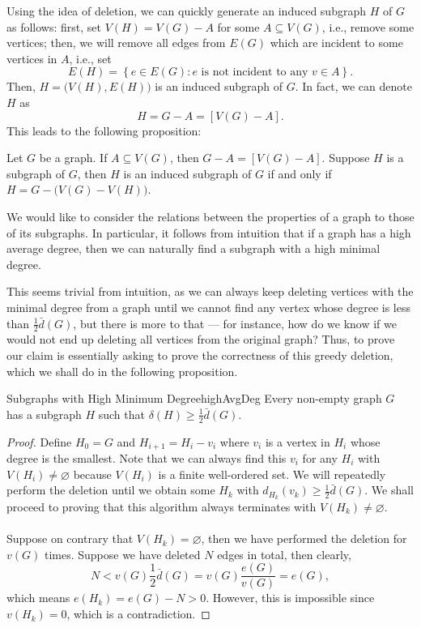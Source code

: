 \documentclass[math, code]{amznotes}
\theoremstyle{remark}
\begin{document}
Using the idea of deletion, we can quickly generate an induced subgraph $H$ of $G$ as follows: first, set $V(H) = V(G) - A$ for some $A \subseteq V(G)$, i.e., remove some vertices; then, we will remove all edges from $E(G)$ which are incident to some vertices in $A$, i.e., set
\begin{equation*}
    E(H) = \left\{e \in E(G) \colon e \textrm{ is not incident to any } v \in A\right\}.
\end{equation*}
Then, $H = \bigl(V(H), E(H)\bigr)$ is an induced subgraph of $G$. In fact, we can denote $H$ as
\begin{equation*}
    H = G - A = [V(G) - A].
\end{equation*}
This leads to the following proposition:
\begin{probox}{}{}
    Let $G$ be a graph. If $A \subseteq V(G)$, then $G - A = [V(G) - A]$. Suppose $H$ is a subgraph of $G$, then $H$ is an induced subgraph of $G$ if and only if $H = G - \bigl(V(G) - V(H)\bigr)$.
\end{probox}
We would like to consider the relations between the properties of a graph to those of its subgraphs. In particular, it follows from intuition that if a graph has a high average degree, then we can naturally find a subgraph with a high minimal degree.

This seems trivial from intuition, as we can always keep deleting vertices with the minimal degree from a graph until we cannot find any vertex whose degree is less than $\frac{1}{2}\bar{d}(G)$, but there is more to that --- for instance, how do we know if we would not end up deleting all vertices from the original graph? Thus, to prove our claim is essentially asking to prove the correctness of this greedy deletion, which we shall do in the following proposition.
\begin{probox}{Subgraphs with High Minimum Degree}{highAvgDeg}
    Every non-empty graph $G$ has a subgraph $H$ such that $\delta(H) \geq \frac{1}{2} \bar{d}(G)$.
    \tcblower
    \begin{proof}
        Define $H_0 = G$ and $H_{i + 1} = H_i - v_i$ where $v_i$ is a vertex in $H_i$ whose degree is the smallest. Note that we can always find this $v_i$ for any $H_i$ with $V(H_i) \neq \varnothing$ because $V(H_i)$ is a finite well-ordered set. We will repeatedly perform the deletion until we obtain some $H_k$ with $d_{H_k}(v_k) \geq \frac{1}{2}\bar{d}(G)$. We shall proceed to proving that this algorithm always terminates with $V(H_k) \neq \varnothing$.
        \\\\
        Suppose on contrary that $V(H_k) = \varnothing$, then we have performed the deletion for $v(G)$ times. Suppose we have deleted $N$ edges in total, then clearly,
        \begin{equation*}
            N < v(G)\frac{1}{2}\bar{d}(G) = v(G)\frac{e(G)}{v(G)} = e(G),
        \end{equation*}
        which means $e(H_k) = e(G) - N > 0$. However, this is impossible since $v(H_k) = 0$, which is a contradiction.
    \end{proof}
\end{probox}
\end{document}
